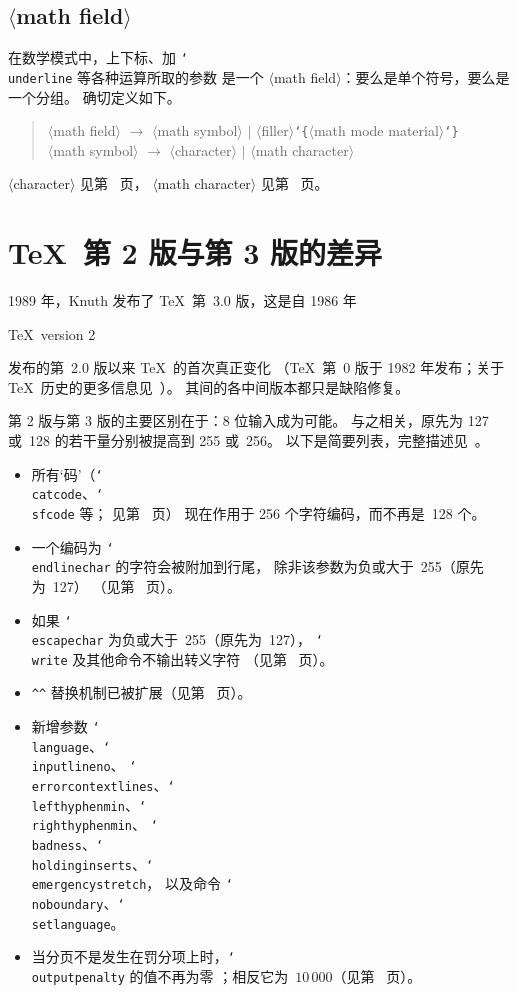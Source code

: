 \documentclass[a4paper]{rapport3}
\def\nl{\protect\\}\def\n#1{{\tt #1}}\def\cs#1{{\tt\char`\\#1}}\let\csc\cs
\def\lb{{\tt\char`\{}}\def\rb{{\tt\char`\}}}
\def\gr#1{$\langle$#1$\rangle$}\def\key#1{{\tt#1}}
\def\alt{}\def\altt{}%
\newenvironment{disp}{\begin{quotation}}{\end{quotation}}
\def\term#1\par{\index{#1}}
\begin{document}
\subsection{\gr{math field}}

在数学模式中，上下标、加 \cs{underline} 等各种运算所取的参数
是一个 \gr{math field}：要么是单个符号，要么是一个分组。
确切定义如下。
\begin{disp}\gr{math field} $\longrightarrow$
    \gr{math symbol} $|$ \gr{filler}\lb\gr{math mode material}\rb\nl
 \gr{math symbol}  $\longrightarrow$ \gr{character} $|$
    \gr{math character}
\end{disp}
\gr{character} 见第~\pageref{character} 页，\alt
\gr{math character} 见第~\pageref{math:character} 页。

\section{\TeX\ 第 2 版与第 3 版的差异}
\label{2vs3}

1989 年，Knuth 发布了 \TeX\ 第~3.0 版，这是自 1986 年
\term \protect\TeX\ version 2\par
发布的第~2.0 版以来 \TeX\ 的首次真正变化
（\TeX\ 第~0 版于 1982 年发布；关于 \TeX\ 历史的更多信息见~\cite{Knuth:TeXerrors}）。
其间的各中间版本都只是缺陷修复。

第 2 版与第 3 版的主要区别在于：8 位输入成为可能。
与之相关，原先为 127 或~128 的若干量分别被提高到 255 或~256。
以下是简要列表，完整描述见~\cite{K:TeX23}。

\begin{itemize}
\item 所有`码'（\cs{catcode}、\cs{sfcode} 等；
      见第~\pageref{codename} 页）
      现在作用于 256 个字符编码，而不再是~128 个。
\item 一个编码为 \cs{endlinechar} 的字符会被附加到行尾，
      除非该参数为负或大于~255（原先为~127）
      （见第~\pageref{append:elc} 页）。
\item 如果 \cs{escapechar} 为负或大于~255（原先为~127），
      \cs{write} 及其他命令不输出转义字符
      （见第~\pageref{use:escape} 页）。
\item \verb>^^> 替换机制已被扩展（见第~\pageref{hathat} 页）。
\item 新增参数 \cs{language}、\cs{inputlineno}、
      \cs{errorcontextlines}、\cs{lefthyphenmin}、\cs{righthyphenmin}、
      \cs{badness}、\cs{holdinginserts}、\cs{emergencystretch}，
      以及命令 \cs{noboundary}、\cs{setlanguage}。
\item 当分页不是发生在罚分项上时，\cs{outputpenalty} 的值不再为零 \alt
      ；相反它为~$10\,000$（见第~\pageref{break:penalty} 页）。
\end{itemize}
\end{document}
